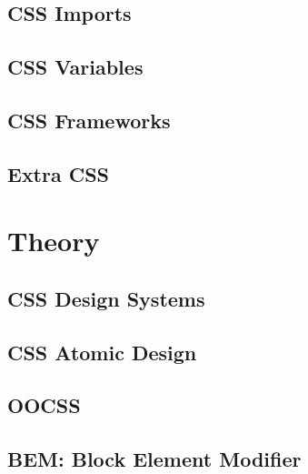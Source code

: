 \documentclass[b5paper,openany]{book}
\begin{document}
\section{CSS Imports}


\section{CSS Variables}


\section{CSS Frameworks}


\section{Extra CSS}
%


\chapter{Theory}

\section{CSS Design Systems}


\section{CSS Atomic Design}


\section{OOCSS}
%

\section{BEM: Block Element Modifier}
%





\end{document}
